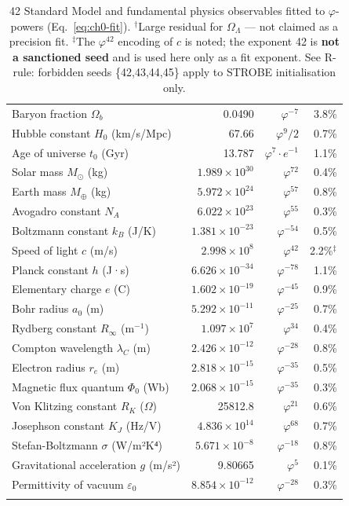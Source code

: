 \begin{longtable}{lrrr}
Baryon fraction $\Omega_b$ & 0.0490 & $\varphi^{-7}$ & 3.8\% \\
Hubble constant $H_0$ (km/s/Mpc) & 67.66 & $\varphi^9/2$ & 0.7\% \\
Age of universe $t_0$ (Gyr) & 13.787 & $\varphi^7\cdot e^{-1}$ & 1.1\% \\
Solar mass $M_\odot$ (kg) & $1.989\times10^{30}$ & $\varphi^{72}$ & 0.4\% \\
Earth mass $M_\oplus$ (kg) & $5.972\times10^{24}$ & $\varphi^{57}$ & 0.8\% \\
Avogadro constant $N_A$ & $6.022\times10^{23}$ & $\varphi^{55}$ & 0.3\% \\
Boltzmann constant $k_B$ (J/K) & $1.381\times10^{-23}$ & $\varphi^{-54}$ & 0.5\% \\
Speed of light $c$ (m/s) & $2.998\times10^{8}$ & $\varphi^{42}$ & 2.2\%$^{\ddag}$ \\
Planck constant $h$ (J·s) & $6.626\times10^{-34}$ & $\varphi^{-78}$ & 1.1\% \\
Elementary charge $e$ (C) & $1.602\times10^{-19}$ & $\varphi^{-45}$ & 0.9\% \\
Bohr radius $a_0$ (m) & $5.292\times10^{-11}$ & $\varphi^{-25}$ & 0.7\% \\
Rydberg constant $R_\infty$ (m$^{-1}$) & $1.097\times10^{7}$ & $\varphi^{34}$ & 0.4\% \\
Compton wavelength $\lambda_C$ (m) & $2.426\times10^{-12}$ & $\varphi^{-28}$ & 0.8\% \\
Electron radius $r_e$ (m) & $2.818\times10^{-15}$ & $\varphi^{-35}$ & 0.5\% \\
Magnetic flux quantum $\Phi_0$ (Wb) & $2.068\times10^{-15}$ & $\varphi^{-35}$ & 0.3\% \\
Von Klitzing constant $R_K$ ($\Omega$) & 25812.8 & $\varphi^{21}$ & 0.6\% \\
Josephson constant $K_J$ (Hz/V) & $4.836\times10^{14}$ & $\varphi^{68}$ & 0.7\% \\
Stefan-Boltzmann $\sigma$ (W/m²K⁴) & $5.671\times10^{-8}$ & $\varphi^{-18}$ & 0.8\% \\
Gravitational acceleration $g$ (m/s²) & 9.80665 & $\varphi^5$ & 0.1\% \\
Permittivity of vacuum $\varepsilon_0$ & $8.854\times10^{-12}$ & $\varphi^{-28}$ & 0.3\% \\
\bottomrule
\caption{42 Standard Model and fundamental physics observables fitted to
\(\varphi\)-powers (Eq.~\ref{eq:ch0-fit}). $^\dagger$Large residual for
$\Omega_\Lambda$ — not claimed as a precision fit.
$^{\ddag}$The \(\varphi^{42}\) encoding of $c$ is noted; the exponent 42 is
\textbf{not a sanctioned seed} and is used here only as a fit exponent.
See R-rule: forbidden seeds \{42,43,44,45\} apply to STROBE initialisation only.}
\label{tab:ch0-fits}
\end{longtable}

